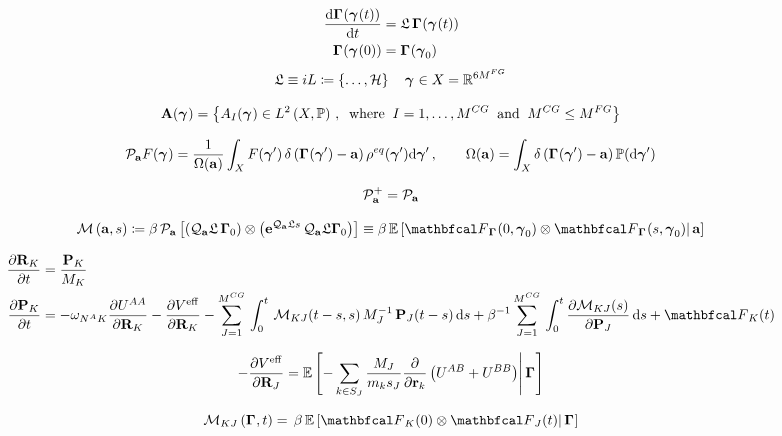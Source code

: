 \documentclass[10pt,a4paper]{book}
\theoremstyle{definition}
\begin{document}
\begin{align*}
  \frac{\mbox{d}\boldsymbol\Gamma_{}(\boldsymbol\gamma_{}(t))}{\mbox{d}t} &= \mathfrak{L}\,\boldsymbol\Gamma_{}(\boldsymbol\gamma_{}(t)) \\
  \boldsymbol\Gamma_{}(\boldsymbol\gamma_{}(0)) &= \boldsymbol\Gamma_{}(\boldsymbol\gamma_{0})
\end{align*}
\begin{equation*}
  \mathfrak{L}\equiv iL \coloneqq \left\lbrace  \ldots,\mathcal{H}\right\rbrace
  \quad \boldsymbol\gamma_{} \in X=\mathbb{R}^{6M^{FG}}
\end{equation*}

$$
\mathbf{A}(\boldsymbol\gamma_{})=\left\lbrace  A_I(\boldsymbol\gamma_{})\in L^2\left(X,\mathbb{P}\right)\,,\;\;\mathrm{where}\;\; I=1,\ldots,M^{CG} \;\;\mathrm{and}\;\; M^{CG}\le M^{FG} \right\rbrace
$$

\begin{equation*}
	\mathcal{P}_{\mathbf{a}}F(\boldsymbol\gamma_{}) = \frac{1}{\Omega(\mathbf{a})} \int_X F(\boldsymbol\gamma_{}')\,\delta\left({\boldsymbol\Gamma_{}(\boldsymbol\gamma_{}')-\mathbf{a}}\right)\rho^{eq}(\boldsymbol\gamma_{}')\mbox{d}\boldsymbol\gamma_{}'\,,
	\qquad 	\Omega(\mathbf{a}) = \int_X\delta\left({\boldsymbol\Gamma_{}(\boldsymbol\gamma_{}')-\mathbf{a}}\right)\mathbb{P}(\mbox{d}\boldsymbol\gamma_{}')
\end{equation*}

\[
\mathcal{P}_{\mathbf{a}}^+ = \mathcal{P}_{\mathbf{a}}
\]

\begin{equation*}
 \fricmat\cip{\bfa,s} \coloneqq 
   \beta\,\pproj_{\bfa}\sqp{ \cip{ \qproj_{\bfa}\Lio\,\Bphase{0}} \otimes \cip{ \exp{\qproj_{\bfa}\Lio s}\,\qproj_{\bfa}\Lio\Bphase{0} } }  
   \equiv
   \beta\,\cexpval{\fprojbf_{\Bphase{}}(0,\Aphase{0})\otimes\fprojbf_{\Bphase{}}(s,\Aphase{0})}{\,\bfa}  
\end{equation*}


\begin{align*}
 \pard{\bfR_{K}}{t} &= \frac{\bfP_{K}}{M_{K}} \\
 \pard{\bfP_{K}}{t} &= -\omega_{\NA{} K} \pard{\pot^{AA}}{\bfR_{K}} - \pard{\Veff}{\bfR_{K}} 
 - \sum_{J=1}^{\ncg}\,\int_{0}^{t}\,\fricmat_{KJ}(t-s,s)\,M_J^{-1}\,\bfP_J(t-s) \,\diff s + \beta^{-1} \sum_{J=1}^{\ncg} \,\int_{0}^{t} \pard{\fricmat_{KJ}(s)}{\bfP_{J}} \,\diff s + \fprojbf_{K}(t) 
\end{align*}

\begin{equation*}
	-\frac{\partial V^{\mathrm{eff}}}{\partial\mathbf{R}_{J}} = \mathbb{E}\left[ {-\sum_{k\in S_J}\frac{M_J}{m_k s_J}\frac{\partial}{\partial\mathbf{r}_k}\left(U^{AB}+U^{BB}\right)} \middle\vert { \,\boldsymbol\Gamma_{}} \right] 
\end{equation*}

\begin{equation*}
 \nonumber
 \fricmat_{KJ}\cip{\Bphase{},t} = \,\beta\, \cexpval{ \fprojbf_{K}(0) \otimes \fprojbf_{J}(t) }{ \,\Bphase{}}
\end{equation*}
\end{document}
